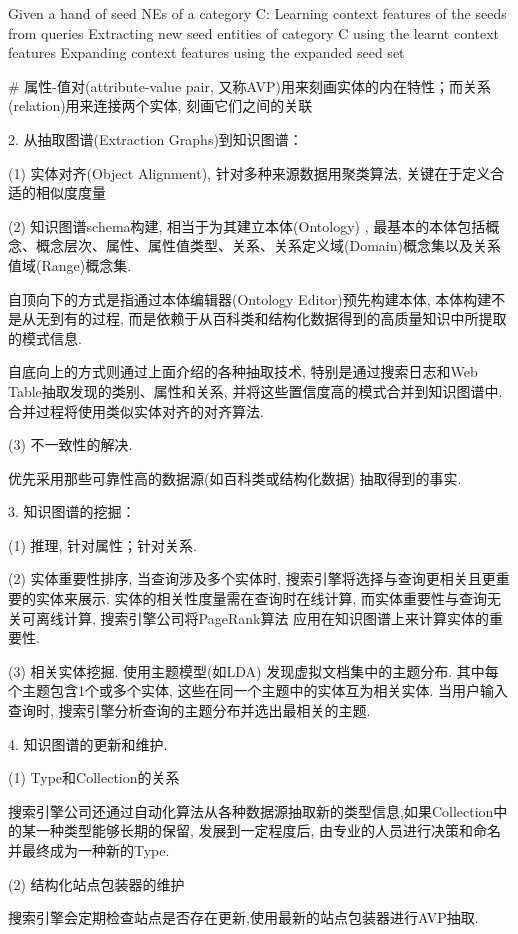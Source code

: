     Given a hand of seed NEs of a category C:
    Learning context features of the seeds from queries
    Extracting new seed entities of category C using the learnt context  features
    Expanding context features using the expanded seed set

\# 属性-值对(attribute-value pair, 又称AVP)用来刻画实体的内在特性；而关系(relation)用来连接两个实体, 刻画它们之间的关联

2. 从抽取图谱(Extraction Graphs)到知识图谱：

(1) 实体对齐(Object Alignment), 针对多种来源数据用聚类算法, 关键在于定义合适的相似度度量

(2) 知识图谱schema构建, 相当于为其建立本体(Ontology) , 最基本的本体包括概念、概念层次、属性、属性值类型、关系、关系定义域(Domain)概念集以及关系值域(Range)概念集.

自顶向下的方式是指通过本体编辑器(Ontology Editor)预先构建本体, 本体构建不是从无到有的过程, 而是依赖于从百科类和结构化数据得到的高质量知识中所提取的模式信息.

自底向上的方式则通过上面介绍的各种抽取技术, 特别是通过搜索日志和Web Table抽取发现的类别、属性和关系, 并将这些置信度高的模式合并到知识图谱中. 合并过程将使用类似实体对齐的对齐算法.

(3) 不一致性的解决.

优先采用那些可靠性高的数据源(如百科类或结构化数据) 抽取得到的事实.

3. 知识图谱的挖掘：

(1) 推理, 针对属性；针对关系.

(2) 实体重要性排序, 当查询涉及多个实体时, 搜索引擎将选择与查询更相关且更重要的实体来展示. 实体的相关性度量需在查询时在线计算, 而实体重要性与查询无关可离线计算, 搜索引擎公司将PageRank算法 应用在知识图谱上来计算实体的重要性.

(3) 相关实体挖掘. 使用主题模型(如LDA) 发现虚拟文档集中的主题分布. 其中每个主题包含1个或多个实体, 这些在同一个主题中的实体互为相关实体. 当用户输入查询时, 搜索引擎分析查询的主题分布并选出最相关的主题.

4. 知识图谱的更新和维护.

(1) Type和Collection的关系

搜索引擎公司还通过自动化算法从各种数据源抽取新的类型信息,如果Collection中的某一种类型能够长期的保留, 发展到一定程度后, 由专业的人员进行决策和命名并最终成为一种新的Type.

(2) 结构化站点包装器的维护

搜索引擎会定期检查站点是否存在更新,使用最新的站点包装器进行AVP抽取.

